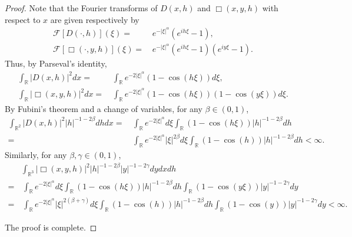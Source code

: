 \documentclass[11pt,reqno]{amsart}
\numberwithin{equation}{section}
\newcommand{\1}{{\bf 1}}
\newcommand{\2}{{\bf 2}}
\begin{document}
\begin{proof}
Note that the Fourier transforms of $D(x, h)$ and $\Box(x, y, h)$ with respect to $x$ are given respectively by 
\begin{align*}
 \mathscr {F}[D(\cdot, h)](\xi)=&\, e^{-|\xi|^{\alpha}}\left(e^{ih\xi}-1\right),\\
 \mathscr {F}[\Box(\cdot, y, h)](\xi)=&\, e^{-|\xi|^{\alpha}}\left(e^{ih\xi}-1\right)\left(e^{iy\xi}-1\right).
\end{align*}
  Thus, by Parseval's identity, 
  \begin{align*}
\int_{\mathbb{R}}|D(x,h)|^2dx =& \, \int_{\mathbb{R}}e^{-2|\xi|^{\alpha}}(1-\cos(h\xi))d\xi,\\  
\int_{\mathbb{R}}|\Box(x,y,h)|^2dx  = & \, \int_{\mathbb{R}}e^{-2|\xi|^{\alpha}}(1-\cos(h\xi))(1-\cos(y\xi))d\xi.
\end{align*}
By Fubini's theorem and a change of variables, for any $\beta\in (0,1)$,
\begin{align*}
\int_{\mathbb{R}^2}|D(x, h)|^2|h|^{-1-2\beta}dhdx=&\, \int_{\mathbb{R}}e^{-2|\xi|^{\alpha}}d\xi
\int_{\mathbb{R}}(1-\cos(h\xi))|h|^{-1-2\beta}dh\\
=&\, \int_{\mathbb{R}}e^{-2|\xi|^{\alpha}}|\xi|^{2\beta}d\xi
\int_{\mathbb{R}}(1-\cos(h))|h|^{-1-2\beta}dh<\infty.
\end{align*} 
Similarly,  for any $\beta, \gamma \in (0,1)$,  
 \begin{align*}
& \int_{\mathbb{R}^3}|\Box(x, y, h)|^2|h|^{-1-2\beta} |y|^{-1-2\gamma}dy dx dh\\
=&\, \int_{\mathbb{R}}e^{-2|\xi|^{\alpha}}d\xi \int_{\mathbb{R}}(1-\cos(h\xi))|h|^{-1-2\beta}dh \int_{\mathbb{R}}(1-\cos(y\xi))|y|^{-1-2\gamma}dy\\
 =&\, \int_{\mathbb{R}}e^{-2|\xi|^{\alpha}}|\xi|^{2(\beta+\gamma)}d\xi
\int_{\mathbb{R}}(1-\cos(h))|h|^{-1-2\beta}dh \int_{\mathbb{R}}(1-\cos(y))|y|^{-1-2\gamma}dy <\infty.
\end{align*} 
  
  The proof is complete. 
\end{proof}
 
\end{document}
